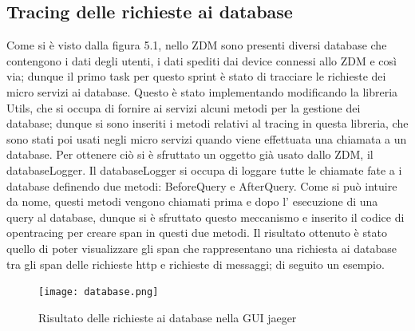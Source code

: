 \documentclass[a4paper,12pt,titlepage,italian,openany]{report}
\begin{document}
\subsection{Tracing delle richieste ai database}
Come si è visto dalla figura 5.1, nello ZDM\cite{zdm:1} sono presenti diversi database che contengono i dati degli utenti, i dati spediti dai device connessi allo ZDM\cite{zdm:1} e così via; dunque il primo task per questo sprint è stato di 
tracciare le richieste dei micro servizi ai database. Questo è stato implementando modificando la libreria Utils, che si occupa di fornire ai servizi alcuni
 metodi per la gestione dei database; 
dunque si sono inseriti i metodi relativi al tracing in questa libreria, che sono stati poi usati negli micro 
servizi quando viene effettuata una chiamata a un database. Per ottenere ciò si è sfruttato un oggetto già usato dallo ZDM\cite{zdm:1}, il databaseLogger. Il databaseLogger si occupa di loggare tutte le chiamate fate a i database definendo due metodi: BeforeQuery e AfterQuery. 
Come si può intuire da nome, questi metodi vengono chiamati prima e dopo l' esecuzione di una query al database, dunque si è sfruttato questo meccanismo e inserito il codice di opentracing per creare span in questi due metodi.
Il risultato ottenuto è stato quello di poter visualizzare gli span che rappresentano una richiesta ai database tra gli span delle richieste http e richieste di messaggi; di seguito un esempio.
\begin{figure}[H]
    \texttt{[image: database.png]}
    \centering
    \caption{Risultato delle richieste ai database nella GUI jaeger}
\end{figure}
\end{document}
